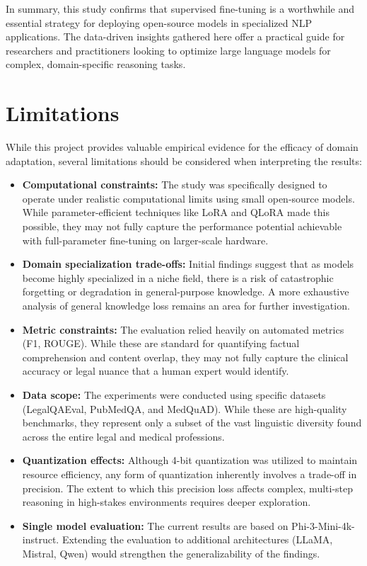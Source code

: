 \documentclass[12pt, letterpaper]{article}
\begin{document}
In summary, this study confirms that supervised fine-tuning is a worthwhile and essential strategy for deploying open-source models in specialized NLP applications. The data-driven insights gathered here offer a practical guide for researchers and practitioners looking to optimize large language models for complex, domain-specific reasoning tasks.

\section{Limitations}
\label{sec:limitations}

While this project provides valuable empirical evidence for the efficacy of domain adaptation, several limitations should be considered when interpreting the results:

\begin{itemize}
    \item \textbf{Computational constraints:} The study was specifically designed to operate under realistic computational limits using small open-source models. While parameter-efficient techniques like LoRA and QLoRA made this possible, they may not fully capture the performance potential achievable with full-parameter fine-tuning on larger-scale hardware.

    \item \textbf{Domain specialization trade-offs:} Initial findings suggest that as models become highly specialized in a niche field, there is a risk of catastrophic forgetting or degradation in general-purpose knowledge. A more exhaustive analysis of general knowledge loss remains an area for further investigation.

    \item \textbf{Metric constraints:} The evaluation relied heavily on automated metrics (F1, ROUGE). While these are standard for quantifying factual comprehension and content overlap, they may not fully capture the clinical accuracy or legal nuance that a human expert would identify.

    \item \textbf{Data scope:} The experiments were conducted using specific datasets (LegalQAEval, PubMedQA, and MedQuAD). While these are high-quality benchmarks, they represent only a subset of the vast linguistic diversity found across the entire legal and medical professions.

    \item \textbf{Quantization effects:} Although 4-bit quantization was utilized to maintain resource efficiency, any form of quantization inherently involves a trade-off in precision. The extent to which this precision loss affects complex, multi-step reasoning in high-stakes environments requires deeper exploration.

    \item \textbf{Single model evaluation:} The current results are based on Phi-3-Mini-4k-instruct. Extending the evaluation to additional architectures (LLaMA, Mistral, Qwen) would strengthen the generalizability of the findings.
\end{itemize}
\end{document}
